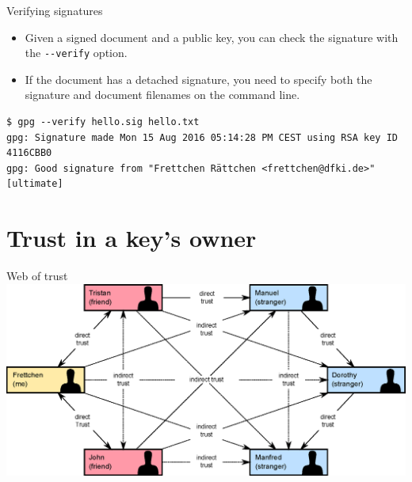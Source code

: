 \documentclass[
mode=present,
paper=smartboard,
size=20pt,
]{powerdot}
\newcommand{\clopt}[1]{\texttt{{-}#1}}
\begin{document}
\begin{slide}[method=direct]{Verifying signatures}
  \begin{itemize}
  \item Given a signed document and a public key, you can check the
    signature with the \clopt{-verify} option.
  \item If the document has a detached signature, you need to specify
    both the signature and document filenames on the command line.
  \end{itemize}
\begin{verbatim}
$ gpg --verify hello.sig hello.txt
gpg: Signature made Mon 15 Aug 2016 05:14:28 PM CEST using RSA key ID 4116CBB0
gpg: Good signature from "Frettchen Rättchen <frettchen@dfki.de>" [ultimate]
\end{verbatim}
\end{slide}

\section{Trust in a key's owner}

\begin{slide}[toc=]{Web of trust}
\centering\includegraphics[width=\linewidth]{images/Web_of_Trust.eps}
\end{slide}
\end{document}
